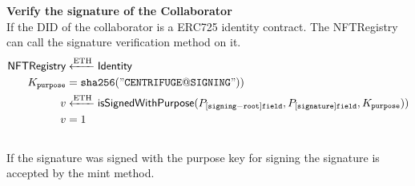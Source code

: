 \textbf{Verify the signature of the Collaborator} \\
If the DID of the collaborator is a ERC725 identity contract. The NFTRegistry can call the signature verification method on it.
\begin{equation}
\begin{split}
\mathsf{NFTRegistry} &\xleftarrow[]{\text{ETH}}  \mathsf{Identity} \\
K_{\texttt{purpose}} & = \mathtt{sha256("CENTRIFUGE@SIGNING"))} \\
v &\xleftarrow[]{\text{ETH}} \textsf{isSignedWithPurpose}(P_{[\mathtt{signing-root}]\mathtt{field}},P_{[\mathtt{signature}]\mathtt{field}},K_{\texttt{purpose}}))\\
v & = 1
\end{split}
\end{equation}
\\
If the signature was signed with the purpose key for signing the signature is accepted by the mint method.

